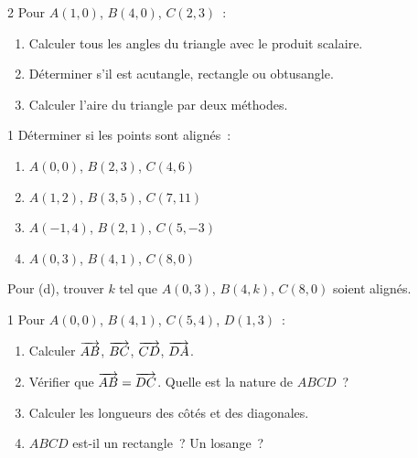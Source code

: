 \begin{exo}{2}
Pour $A(1,0)$, $B(4,0)$, $C(2,3)$~:
\begin{enumerate}
  \item Calculer tous les angles du triangle avec le produit scalaire.
  \item D\'eterminer s'il est acutangle, rectangle ou obtusangle.
  \item Calculer l'aire du triangle par deux m\'ethodes.
\end{enumerate}
\end{exo}

\begin{exo}{1}
D\'eterminer si les points sont align\'es~:
\begin{enumerate}
  \item $A(0,0)$, $B(2,3)$, $C(4,6)$
  \item $A(1,2)$, $B(3,5)$, $C(7,11)$
  \item $A(-1,4)$, $B(2,1)$, $C(5,-3)$
  \item $A(0,3)$, $B(4,1)$, $C(8,0)$
\end{enumerate}
Pour (d), trouver $k$ tel que $A(0,3)$, $B(4,k)$, $C(8,0)$ soient align\'es.
\end{exo}

\begin{exo}{1}
Pour $A(0,0)$, $B(4,1)$, $C(5,4)$, $D(1,3)$~:
\begin{enumerate}
  \item Calculer $\overrightarrow{AB}$, $\overrightarrow{BC}$, $\overrightarrow{CD}$, $\overrightarrow{DA}$.
  \item V\'erifier que $\overrightarrow{AB}=\overrightarrow{DC}$. Quelle est la nature de $ABCD$~?
  \item Calculer les longueurs des c\^ot\'es et des diagonales.
  \item $ABCD$ est-il un rectangle~? Un losange~?
\end{enumerate}
\end{exo}

